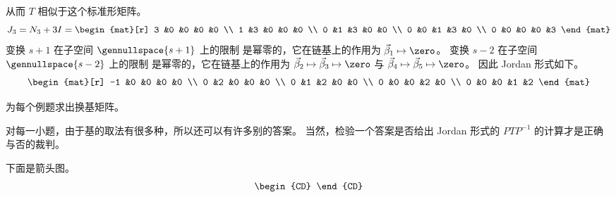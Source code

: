 \begin{exercises}
\begin{answer}
\begin{exparts}
\begin{equation*}
          \end{equation*}
          从而 $T$ 相似于这个标准形矩阵。
          \begin{equation*}
           J_3=N_3+3I=
           \begin{mat}[r]
               3  &0  &0  &0  &0  \\
               1  &3  &0  &0  &0  \\
               0  &1  &3  &0  &0  \\
               0  &0  &1  &3  &0  \\
               0  &0  &0  &0  &3
             \end{mat}
          \end{equation*} 
         \partsitem 变换 $s+1$ 在子空间 $\gennullspace{s+1}$ 上的限制
          是幂零的，它在链基上的作用为 $\vec{\beta}_1\mapsto\zero$。  
          变换 $s-2$ 在子空间 $\gennullspace{s-2}$ 上的限制
          是幂零的，它在链基上的作用为 $\vec{\beta}_2\mapsto\vec{\beta}_3\mapsto\zero$
          与 $\vec{\beta}_4\mapsto\vec{\beta}_5\mapsto\zero$。        
          因此 Jordan 形式如下。
          \begin{equation*}
            \begin{mat}[r]
              -1  &0  &0  &0  &0  \\
               0  &2  &0  &0  &0  \\
               0  &1  &2  &0  &0  \\
               0  &0  &0  &2  &0  \\
               0  &0  &0  &1  &2
             \end{mat} 
          \end{equation*}
      \end{exparts}  
    \end{answer}
  \item 
    为每个例题求出换基矩阵。 
    \begin{exparts*}
      \partsitem {}
      \partsitem {}
      \partsitem {}
    \end{exparts*}
    \begin{answer}
      对每一小题，由于基的取法有很多种，所以还可以有许多别的答案。
      当然，检验一个答案是否给出 Jordan 形式的 $PTP^{-1}$
      的计算才是正确与否的裁判。
      \begin{exparts}
        \partsitem 下面是箭头图。
          \begin{equation*}
            \begin{CD}

\end{CD}
\end{equation*}
\end{exparts}
\end{answer}
\end{exercises}

